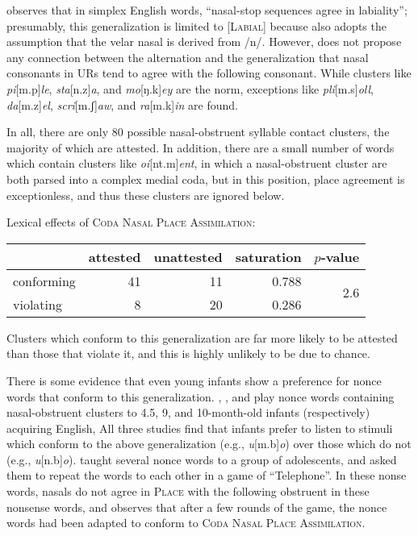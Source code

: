 \citet[][175]{Pierrehumbert1994} observes that in simplex English words, ``nasal-stop sequences agree in labiality''; presumably, this generalization is limited to [\textsc{Labial}] because \citeauthor{Pierrehumbert1994} also adopts the assumption that the velar nasal is derived from /n/. However, \citeauthor{Pierrehumbert1994} does not propose any connection between the alternation and the generalization that nasal consonants in URs tend to agree with the following consonant. While clusters like \emph{pi}[m.p]\emph{le}, \emph{sta}[n.z]\emph{a}, and \emph{mo}[ŋ.k]\emph{ey} are the norm, exceptions like \emph{pli}[m.s]\emph{oll}, \emph{da}[m.z]\emph{el}, \emph{scri}[m.ʃ]\emph{aw}, and \emph{ra}[m.k]\emph{in} are found.

In all, there are only 80 possible nasal-obstruent syllable contact clusters, the majority of which are attested. In addition, there are a small number of words which contain clusters like \emph{oi}[nt.m]\emph{ent}, in which a nasal-obstruent cluster are both parsed into a complex medial coda, but in this position, place agreement is exceptionless, and thus these clusters are ignored below.

\begin{example}
Lexical effects of \textsc{Coda Nasal Place Assimilation}: 

\vspace{0.5\baselineskip}
\begin{tabular}{l r r r r}
\toprule
           & attested & unattested & saturation & $p$-value \\
\midrule
conforming & 41 & 11 & 0.788 & \multirow{2}{*}{2.6\e{-05}}\\
violating  & 8  & 20 & 0.286 \\
\bottomrule
\end{tabular}
\end{example}

\noindent
Clusters which conform to this generalization are far more likely to be attested than those that violate it, and this is highly unlikely to be due to chance.

There is some evidence that even young infants show a preference for nonce words that conform to this generalization. %
\citet{Davidson2004}, \citet{Mattys1999}, and \citet{Jusczyk2002} play nonce words containing nasal-obstruent clusters to 4.5, 9, and 10-month-old infants (respectively) acquiring English, All three studies find that infants prefer to listen to stimuli which conform to the above generalization (e.g., \emph{u}[m.b]\emph{o}) over those which do not (e.g., \emph{u}[n.b]\emph{o}). \citet{Wright1975} taught several nonce words to a group of adolescents, and asked them to repeat the words to each other in a game of ``Telephone''. In these nonse words, nasals do not agree in \textsc{Place} with the following obstruent in these nonsense words, and \citeauthor{Wright1975} observes that after a few rounds of the game, the nonce words had been adapted to conform to \textsc{Coda Nasal Place Assimilation}.

